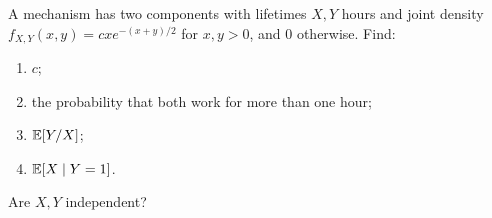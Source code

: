 \documentclass[a4paper]{report}
\begin{document}
\begin{problem}
A mechanism has two components with lifetimes $X,Y$ hours and joint density $f_{X,Y}(x,y)=cxe^{-(x+y)/2}$ for $x,y>0$, and 0 otherwise. Find:
\begin{enumerate}
\item $c$;
\item the probability that both work for more than one hour;
\item $\mathbb {E}[Y/X]$;
\item $\mathbb {E}[X\mid Y=1]$.
\end{enumerate}
Are $X,Y$ independent?
\end{problem}
\end{document}
